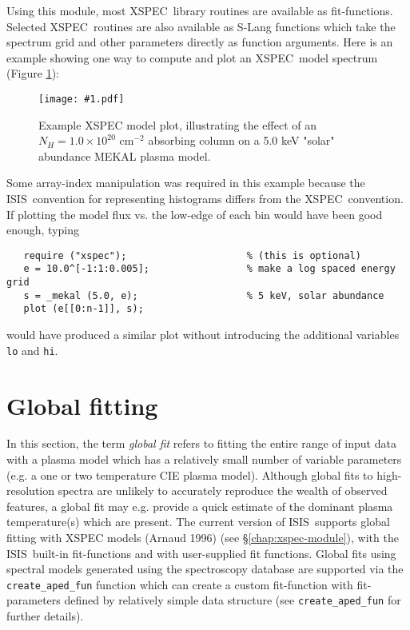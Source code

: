 \documentclass{book}
\newcommand{\putfig}[1]{\texttt{[image: \#1.pdf]}}
\newcommand{\putfig}[1]{\psfig{file=#1.ps}}
\newcommand{\isisx}{{\sc ISIS~}}
\newcommand{\xspec}{{\sc XSPEC}}
\begin{document}
Using this module, most \xspec\ library routines are available
as fit-functions.  Selected \xspec\ routines are also available
as S-Lang functions which take the spectrum grid and other
parameters directly as function arguments. Here is an example
showing one way to compute and plot an \xspec\ model spectrum
(Figure \ref{fig:xspec}):



\begin{figure}[ht]
\putfig{figures/xspec}
\caption{Example XSPEC model plot, illustrating the effect of an $N_H = 1.0 \times
10^{20}$ cm${}^{-2}$ absorbing column on a 5.0 keV "solar" abundance MEKAL
plasma model.}
\label{fig:xspec}
\end{figure}

Some array-index manipulation was required in this example because the
\isisx convention for representing histograms differs from the
\xspec\ convention. If plotting the model flux vs. the low-edge of each bin would
have been good enough, typing
 \begin{verbatim}
   require ("xspec");                     % (this is optional)
   e = 10.0^[-1:1:0.005];                 % make a log spaced energy grid
   s = _mekal (5.0, e);                   % 5 keV, solar abundance
   plot (e[[0:n-1]], s);
 \end{verbatim}
would have produced a similar plot without introducing the
additional variables {\tt lo} and {\tt hi}.

\section{Global fitting}

In this section, the term {\it global fit} refers to fitting the
entire range of input data with a plasma model which has a
relatively small number of variable parameters (e.g. a one or two
temperature CIE plasma model). Although global fits to
high-resolution spectra are unlikely to accurately reproduce the
wealth of observed features, a global fit may e.g. provide a quick
estimate of the dominant plasma temperature(s) which are present.
The current version of \isisx supports global fitting with {\sc
XSPEC} models (Arnaud 1996) (see \S\ref{chap:xspec-module}), with
the \isisx built-in fit-functions and with user-supplied fit
functions. Global fits using spectral models generated using the
spectroscopy database are supported via the \verb|create_aped_fun|
function which can create a custom fit-function with
fit-parameters defined by relatively simple data structure
(see \verb|create_aped_fun| for further details).
\end{document}
